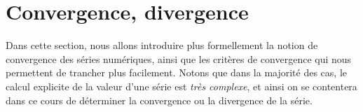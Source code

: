


\section{Convergence, divergence}
Dans cette section, nous allons introduire plus formellement la notion de convergence des séries numériques, ainsi que les critères de convergence qui nous permettent de trancher plus facilement. Notons que dans la majorité des cas, le calcul explicite de la valeur d'une série est \emph{très complexe}, et ainsi on se contentera dans ce cours de déterminer la convergence ou la divergence de la série.

